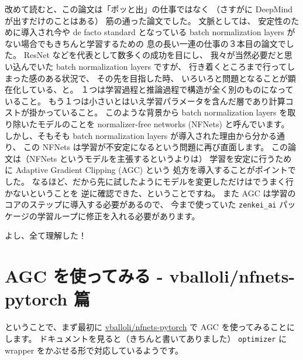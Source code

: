 \documentclass[dvipdfmx,autodetect-engine,10pt,b5paper,papersize,openany,dvipsnames]{jsbook}
\begin{document}
\begin{multicols}{2}
改めて読むと、この論文は「ポッと出」の仕事ではなく
（さすがに DeepMind が出すだけのことはある）
筋の通った論文でした。
文脈としては、
安定性のために導入され今や de facto standard となっている
batch normalization layers がない場合でもきちんと学習するための
息の長い一連の仕事の３本目の論文でした。
ResNet などを代表として数多くの成功を目にし、
我々が当然必要だと思い込んでいた batch normalization layers ですが、
行き着くところまで行ってしまった感のある状況で、
その先を目指した時、
いろいろと問題となることが顕在化している、と。
１つは学習過程と推論過程で構造が全く別のものになっていること。
もう１つは小さいとはいえ学習パラメータを含んだ層であり計算コストが掛かっていること。
このような背景から batch normalization layers を取り除いたモデルのことを
normalizer-free networks (NFNets) と呼んでいます。
しかし、そもそも batch normalization layers が導入された理由から分かる通り、
この NFNets は学習が不安定になるという問題に再び直面します。
この論文は（NFNets というモデルを主張するというよりは）
学習を安定に行うために Adaptive Gradient Clipping (AGC) という
処方を導入することがポイントでした。
なるほど、だから先に試したようにモデルを変更しただけはでうまく行かないということを
逆に確認できた、ということですね。
また AGC は学習のコアのステップに導入する必要があるので、
今まで使っていた \texttt{zenkei\_ai} パッケージの学習ループに修正を入れる必要があります。

よし、全て理解した！


\section{AGC を使ってみる - vballoli/nfnets-pytorch 篇}
ということで、まず最初に
\href{https://github.com/vballoli/nfnets-pytorch}{vballoli/nfnets-pytorch}
で AGC を使ってみることにします。
ドキュメントを見ると（きちんと書いてありました）
\texttt{optimizer} に wrapper をかぶせる形で対応しているようです。



\end{multicols}
\end{document}

